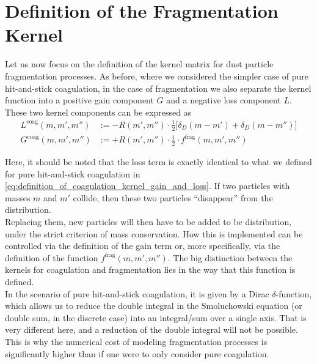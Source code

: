 
\clearpage\section{Definition of the Fragmentation Kernel}
\label{sec:fragmentation_kernel}

    Let us now focus on the definition of the kernel matrix for dust particle fragmentation 
    processes. As before, where we considered the simpler case of pure hit-and-stick coagulation,
    in the case of fragmentation we also separate the kernel function into a positive gain 
    component $G$ and a negative loss component $L$. \\

    These two kernel components can be expressed as
    \begin{align}
        L^\text{coag}(m, m', m'') 
            &:= -R(m',m'') \cdot \frac{1}{2} \bigg[\delta_D(m-m')+\delta_D(m-m'')\bigg] \\
        G^\text{coag}(m, m', m'') 
            &:= +R(m',m'') \cdot \frac{1}{2} \cdot f^\text{frag}(m,m',m'')
    \end{align}

    Here, it should be noted that the loss term is exactly identical to what we defined for pure
    hit-and-stick coagulation in \cref{eq:definition_of_coagulation_kernel_gain_and_loss}.
    If two particles with masses $m$ and $m'$ collide, then these two particles ``disappear''
    from the distribution. \\ 

    Replacing them, new particles will then have to be added to be distribution, under the strict 
    criterion of mass conservation. How this is implemented can be controlled via the definition 
    of the gain term or, more specifically, via the definition of the function 
    $f^\text{frag}(m, m', m'')$.
    The big distinction between the kernels for coagulation and fragmentation lies 
    in the way that this function is defined. \\

    In the scenario of pure hit-and-stick coagulation, it is given by a Dirac $\delta$-function,
    which allows us to reduce the double integral in the Smoluchowski equation (or double sum, in 
    the discrete case) into an integral/sum over a single axis. That is very different here,
    and a reduction of the double integral will not be possible. This is why the numerical 
    cost of modeling fragmentation processes is significantly higher than if one were to only 
    consider pure coagulation. \\

